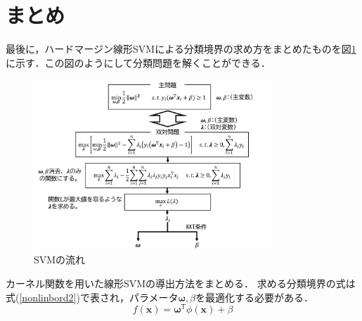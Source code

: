 \documentclass[11pt,a4paper,titlepage]{ltjsarticle}
\begin{document}
\section{まとめ}
最後に，ハードマージン線形SVMによる分類境界の求め方をまとめたものを図\ref{flow}に示す\cite{soft-mergin}．この図のようにして分類問題を解くことができる．
\begin{figure}[H]
    \centering
    \includegraphics[width=0.8\textwidth]{image/svmmatome.png}
    \caption{SVMの流れ}
    \label{flow}
\end{figure}
カーネル関数を用いた線形SVMの導出方法をまとめる．
求める分類境界の式は式(\ref{nonlinbord2})で表され，パラメータ$\bm{\omega},\beta$を最適化する必要がある．
\begin{equation}
    \label{nonlinbord2}
    f(\bm{x}) = \bm{\omega}^\mathsf{T}\phi(\bm{x}) + \beta
\end{equation}
\end{document}
